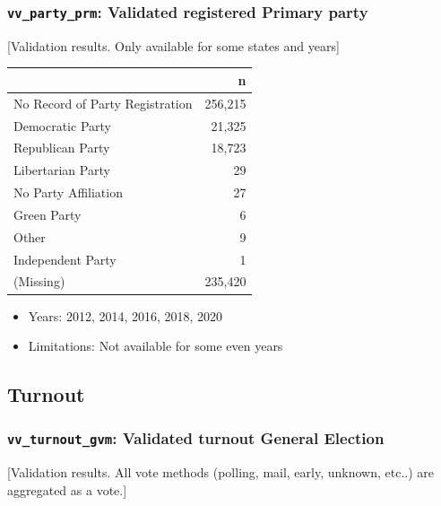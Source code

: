 \documentclass[10pt,article,oneside]{memoir}
\theoremstyle{definition}
\begin{document}
\hypertarget{vv_party_prm-validated-registered-primary-party}{%
\subsubsection{\texorpdfstring{\texttt{vv\_party\_prm}: Validated
registered Primary
party}{vv\_party\_prm: Validated registered Primary party}}\label{vv_party_prm-validated-registered-primary-party}}

{[}Validation results. Only available for some states and years{]}

\begin{table}[H]
\centering
\begin{tabular}{lr}
\toprule
 & n\\
\midrule
No Record of Party Registration & 256,215\\
Democratic Party & 21,325\\
Republican Party & 18,723\\
Libertarian Party & 29\\
No Party Affiliation & 27\\
Green Party & 6\\
Other & 9\\
Independent Party & 1\\
(Missing) & 235,420\\
\bottomrule
\end{tabular}
\end{table}

\begin{itemize}
\tightlist
\item
  Years: 2012, 2014, 2016, 2018, 2020
\item
  Limitations: Not available for some even years
\end{itemize}

\hypertarget{turnout}{%
\subsection{Turnout}\label{turnout}}

\hypertarget{vv_turnout_gvm-validated-turnout-general-election}{%
\subsubsection{\texorpdfstring{\texttt{vv\_turnout\_gvm}: Validated
turnout General
Election}{vv\_turnout\_gvm: Validated turnout General Election}}\label{vv_turnout_gvm-validated-turnout-general-election}}

{[}Validation results. All vote methods (polling, mail, early, unknown,
etc..) are aggregated as a vote.{]}
\end{document}

